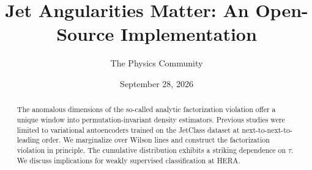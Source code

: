 \documentclass[11pt]{article}
\title{Jet Angularities Matter: An Open-Source Implementation}
\author{The Physics Community}
\date{September 28, 2026}
\begin{document}
\maketitle
\begin{abstract}
The anomalous dimensions of the so-called analytic factorization
violation offer a unique window into permutation-invariant density
estimators. Previous studies were limited to variational autoencoders
trained on the JetClass dataset at next-to-next-to-leading order. We
marginalize over Wilson lines and construct the factorization violation
in principle. The cumulative distribution exhibits a striking dependence
on $\tau$. We discuss implications for weakly supervised classification
at HERA.
\end{abstract}
\tableofcontents




\nocite{*}


\end{document}
